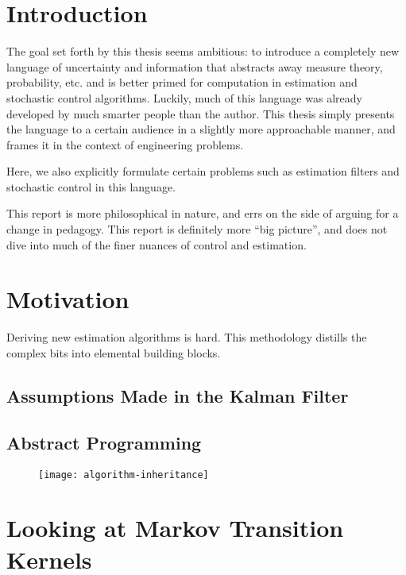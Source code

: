 \chapter{Introduction}

The goal set forth by this thesis seems ambitious: to introduce a completely new language of uncertainty and information that abstracts away measure theory, probability, etc. and is better primed for computation in estimation and stochastic control algorithms.
Luckily, much of this language was already developed by much smarter people than the author. This thesis simply presents the language to a certain audience in a slightly more approachable manner, and frames it in the context of engineering problems.

Here, we also explicitly formulate certain problems such as estimation filters and stochastic control in this language.

This report is more philosophical in nature, and errs on the side of arguing for a change in pedagogy.
This report is definitely more ``big picture'', and does not dive into much of the finer nuances of control and estimation.


\chapter{Motivation}

Deriving new estimation algorithms is hard.
This methodology distills the complex bits into elemental building blocks.


\section{Assumptions Made in the Kalman Filter}
\section{Abstract Programming}

\begin{figure}[htb]
    \texttt{[image: algorithm-inheritance]}
	\caption{}
    \label{fig:algorithm-inheritance}
\end{figure}

\chapter{Looking at Markov Transition Kernels}

